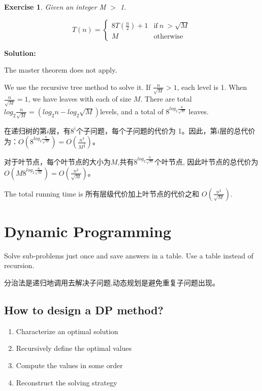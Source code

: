 \documentclass{article}
\newtheorem*{Exercise}{Exercise}
\begin{document}
\begin{Exercise}
    Given an integer M $>$ 1.\par
    $$T(n) =
    \begin{cases}
    8T (\frac{n}{2}) + 1 & \text{if} \ n \ > \sqrt{M}\\
    M & \text{otherwise}
    \end{cases}$$
\end{Exercise}

\textbf{Solution:}

The master theorem does not apply.

We use the recursive tree method to solve it. If $\frac{n}{\sqrt{M}} > 1$, each level is 1. When $\frac{n}{\sqrt{M}} = 1$, we have leaves with each of size $M$. There are total $log_2 \frac{n}{\sqrt{M}} = (log_2 n - log_2 \sqrt{M})$levels, and a total of $8^{log_2 \frac{n}{\sqrt{M}}}$ leaves.

在递归树的第$i$层，有$8^i$个子问题，每个子问题的代价为 1。因此，第$i$层的总代价为：$O(8^{log_2 \frac{n}{\sqrt{M}}}) = O(\frac{n^3}{M^{\frac{3}{2}}})$。

对于叶节点，每个叶节点的大小为$M$,共有$8^{log_2 \frac{n}{\sqrt{M}}} $个叶节点, 因此叶节点的总代价为$O(M 8^{log_2 \frac{n}{\sqrt{M}}}) = O(\frac{n^3}{\sqrt{M}})$。

The total running time is 所有层级代价加上叶节点的代价之和 $O(\frac{n^3}{\sqrt{M}})$. 

\newpage

\section{Dynamic Programming}
Solve sub-problems just once and save answers in a table. Use a table instead of recursion.\par
分治法是递归地调用去解决子问题,动态规划是避免重复子问题出现。

\subsection{How to design a DP method?}
\begin{enumerate}
    \item Characterize an optimal solution
    \item Recursively define the optimal values
    \item Compute the values in some order
    \item Reconstruct the solving strategy
\end{enumerate}
\hspace*{\fill}\par
\end{document}
